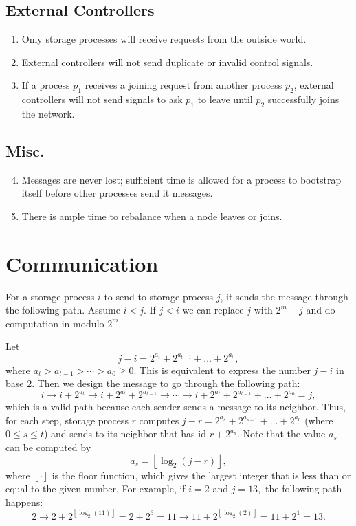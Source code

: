 \documentclass[11pt]{article}
\begin{document}
\subsection{External Controllers}
\begin{enumerate}[\text{A}1]
\item \label{A:finite_time_red} Only storage processes will receive requests from the outside world.

\item \label{A:no_invalid_signals} External controllers will not send duplicate or invalid control signals.

\item \label{A:E_guarantees_nodes_entering_network} If a process $p_1$ receives a joining request from another process $p_2$, external controllers will not send signals to ask $p_1$ to leave until $p_2$ successfully joins the network.
\end{enumerate}

\subsection{Misc.}
\begin{enumerate}[\text{A}1]
\setcounter{enumi}{3}
\item \label{A:message_never_lost} Messages are never lost; sufficient time is allowed for a process to bootstrap itself before other processes send it messages.
\item There is ample time to rebalance when a node leaves or joins.
\end{enumerate}


\section{Communication}
For a storage process $i$ to send to storage process $j$, it sends 
the message through the following path. Assume $i < j$. If $j < i$ we can replace $j$ with $2^m + j$ and do computation in modulo $2^m.$

Let
\[
    j - i = 2^{a_t} + 2^{a_{t - 1}} + \ldots + 2^{a_0},
\]
where $a_t > a_{t - 1} > \cdots > a_0 \geq 0.$ This is equivalent to express the number $j - i$ in base 2. Then we design the message to go through the following path:
\[
    i \longrightarrow i + 2^{a_t} \longrightarrow i + 2^{a_t} + 2^{a_{t - 1}} \longrightarrow \cdots \longrightarrow 
    i + 2^{a_t} + 2^{a_{t - 1}} + \ldots + 2^{a_0} = j,
\]
which is a valid path because each sender sends a message to its neighbor. Thus, for each step, storage process $r$ computes $j - r = 2^{a_s} + 2^{a_{s-1}} + \ldots + 2^{a_0}$ (where $0\leq s \leq t$) and sends to its neighbor that has id $r + 2^{a_s}$. Note that the value $a_s$ can be computed by
\[
    a_s = \left\lfloor \log_2(j - r) \right\rfloor,
\]
where $\left\lfloor \cdot \right\rfloor$ is the floor function, which gives the largest integer that is less than or equal to the given number. For example, if $i = 2$ and $j = 13,$ the following path happens:
\[
    2 \longrightarrow 2 + 2^{\left\lfloor \log_2(11) \right\rfloor} = 2 + 2^3 = 11  \longrightarrow 11 + 2^{\left\lfloor \log_2(2) \right\rfloor} = 11 + 2^1 = 13.
\]
\end{document}
